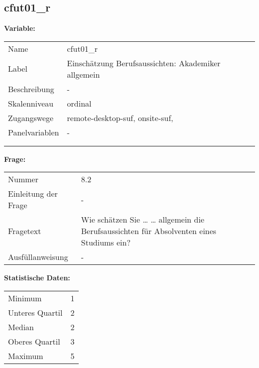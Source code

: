 	
	
	\subsection{cfut01\_r}
	\label{subSection:cfut01_r}

	\noindent\textbf{Variable:}\\
		\begin{tabular}{lL{11.3cm}}
			\label{tableVariable:cfut01_r}
			Name & cfut01\_r \\
			Label & Einschätzung Berufsaussichten: Akademiker allgemein \\
			Beschreibung & - \\
			Skalenniveau & ordinal \\
			Zugangswege &
				remote-desktop-suf,
				onsite-suf,
 \\
			Panelvariablen & -
			 \\
			 \\
 \\
		\end{tabular}

		\vspace*{1 cm}
		\noindent\textbf{Frage:}\\
		\begin{tabular}{lL{11.3cm}}
			\label{tableQuestion:cfut01_r}
			Nummer & 8.2 \\
			Einleitung der Frage & - \\
			Fragetext & Wie schätzen Sie …
… allgemein die Berufsaussichten für Absolventen eines Studiums ein? \\
			Ausfüllanweisung & - \\
		\end{tabular}


		\vspace*{1 cm}
		\noindent\textbf{Statistische Daten:}\\
			\begin{tabular}{ll}
				\label{tableStatistics:cfut01_r}
					Minimum & 1 \\
					Unteres Quartil & 2 \\
					Median & 2 \\
					Oberes Quartil & 3 \\
					Maximum & 5 \\
			\end{tabular}



